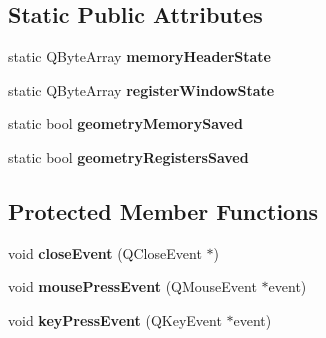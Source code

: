 \subsection*{Static Public Attributes}
\begin{DoxyCompactItemize}
\item 
\hypertarget{class_debug_table_widget_a0ed3f2adc6845b3577c4395e64839252}{}static Q\+Byte\+Array {\bfseries memory\+Header\+State}\label{class_debug_table_widget_a0ed3f2adc6845b3577c4395e64839252}

\item 
\hypertarget{class_debug_table_widget_a91db0ae3cf15652b8df4284c2714b4da}{}static Q\+Byte\+Array {\bfseries register\+Window\+State}\label{class_debug_table_widget_a91db0ae3cf15652b8df4284c2714b4da}

\item 
\hypertarget{class_debug_table_widget_ad78dd6c6a348da08ad18dfdbf6272c77}{}static bool {\bfseries geometry\+Memory\+Saved}\label{class_debug_table_widget_ad78dd6c6a348da08ad18dfdbf6272c77}

\item 
\hypertarget{class_debug_table_widget_a0b98bcbe0af39cad3262901a24e72f1b}{}static bool {\bfseries geometry\+Registers\+Saved}\label{class_debug_table_widget_a0b98bcbe0af39cad3262901a24e72f1b}

\end{DoxyCompactItemize}
\subsection*{Protected Member Functions}
\begin{DoxyCompactItemize}
\item 
\hypertarget{class_debug_table_widget_a1f54a1476d5e6b593a7122f125302791}{}void {\bfseries close\+Event} (Q\+Close\+Event $\ast$)\label{class_debug_table_widget_a1f54a1476d5e6b593a7122f125302791}

\item 
\hypertarget{class_debug_table_widget_a9916b91e7858973c3611ddeba648c69a}{}void {\bfseries mouse\+Press\+Event} (Q\+Mouse\+Event $\ast$event)\label{class_debug_table_widget_a9916b91e7858973c3611ddeba648c69a}

\item 
\hypertarget{class_debug_table_widget_ae2d309bb3c50be05fbc715d67522de66}{}void {\bfseries key\+Press\+Event} (Q\+Key\+Event $\ast$event)\label{class_debug_table_widget_ae2d309bb3c50be05fbc715d67522de66}

\end{DoxyCompactItemize}
